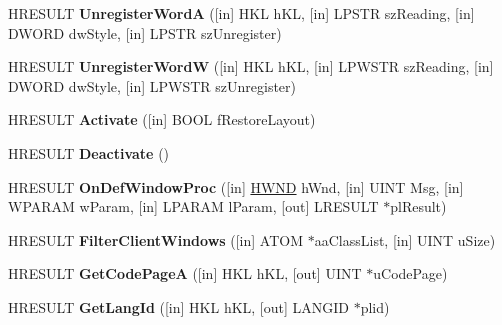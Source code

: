 \begin{DoxyCompactItemize}
H\+R\+E\+S\+U\+LT {\bfseries Unregister\+WordA} (\mbox{[}in\mbox{]} H\+KL h\+KL, \mbox{[}in\mbox{]} L\+P\+S\+TR sz\+Reading, \mbox{[}in\mbox{]} D\+W\+O\+RD dw\+Style, \mbox{[}in\mbox{]} L\+P\+S\+TR sz\+Unregister)
\item 
\mbox{\label{interface_i_active_i_m_m_app_a93362118ace9fe72065298abab2c3a7e}} 
H\+R\+E\+S\+U\+LT {\bfseries Unregister\+WordW} (\mbox{[}in\mbox{]} H\+KL h\+KL, \mbox{[}in\mbox{]} L\+P\+W\+S\+TR sz\+Reading, \mbox{[}in\mbox{]} D\+W\+O\+RD dw\+Style, \mbox{[}in\mbox{]} L\+P\+W\+S\+TR sz\+Unregister)
\item 
\mbox{\label{interface_i_active_i_m_m_app_af588b571246a8796033fb9eee4156062}} 
H\+R\+E\+S\+U\+LT {\bfseries Activate} (\mbox{[}in\mbox{]} B\+O\+OL f\+Restore\+Layout)
\item 
\mbox{\label{interface_i_active_i_m_m_app_a9ceb2b05699092d4ff235b24553dffff}} 
H\+R\+E\+S\+U\+LT {\bfseries Deactivate} ()
\item 
\mbox{\label{interface_i_active_i_m_m_app_a5f2284c170f64b3a3f2797488cd15a07}} 
H\+R\+E\+S\+U\+LT {\bfseries On\+Def\+Window\+Proc} (\mbox{[}in\mbox{]} \hyperlink{interfacevoid}{H\+W\+ND} h\+Wnd, \mbox{[}in\mbox{]} U\+I\+NT Msg, \mbox{[}in\mbox{]} W\+P\+A\+R\+AM w\+Param, \mbox{[}in\mbox{]} L\+P\+A\+R\+AM l\+Param, \mbox{[}out\mbox{]} L\+R\+E\+S\+U\+LT $\ast$pl\+Result)
\item 
\mbox{\label{interface_i_active_i_m_m_app_a3c80df583d3f648eaabed3e41385b18c}} 
H\+R\+E\+S\+U\+LT {\bfseries Filter\+Client\+Windows} (\mbox{[}in\mbox{]} A\+T\+OM $\ast$aa\+Class\+List, \mbox{[}in\mbox{]} U\+I\+NT u\+Size)
\item 
\mbox{\label{interface_i_active_i_m_m_app_a49bee6e85e11964b9ae114eb91fede52}} 
H\+R\+E\+S\+U\+LT {\bfseries Get\+Code\+PageA} (\mbox{[}in\mbox{]} H\+KL h\+KL, \mbox{[}out\mbox{]} U\+I\+NT $\ast$u\+Code\+Page)
\item 
\mbox{\label{interface_i_active_i_m_m_app_ace2731cd8113cb486f8ea3478f62242e}} 
H\+R\+E\+S\+U\+LT {\bfseries Get\+Lang\+Id} (\mbox{[}in\mbox{]} H\+KL h\+KL, \mbox{[}out\mbox{]} L\+A\+N\+G\+ID $\ast$plid)

\end{DoxyCompactItemize}
